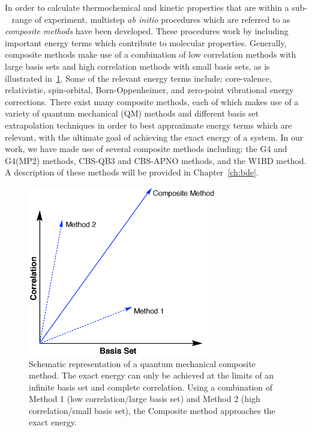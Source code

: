 In order to calculate thermochemical and kinetic properties that are within a sub-\kcalmol~ range of experiment, multistep \emph{ab initio} procedures which are referred to as \emph{composite methods} have been developed.\cite{Karton2016} These procedures work by including important energy terms which contribute to molecular properties. Generally, composite methods make use of a combination of low correlation methods with large basis sets and high correlation methods with small basis sets, as is illustrated in~\ref{fig:comp}. Some of the relevant energy terms include: core-valence, relativistic, spin-orbital, Born-Oppenheimer, and zero-point vibrational energy corrections. There exist many composite methods, each of which makes use of a variety of quantum mechanical (QM) methods and different basis set extrapolation techniques in order to best approximate energy terms which are relevant, with the ultimate goal of achieving the exact energy of a system. In our work, we have made use of several composite methods including: the G4 and G4(MP2) methods,\cite{Curtiss2007,Curtiss2007a} CBS-QB3 and CBS-APNO methods,\cite{Montgomery1999,Montgomery2000,Ochterski1996} and the W1BD method.\cite{Barnes2009} A description of these methods will be provided in Chapter~\ref{ch:bde}.

\begin{figure}[htb]
  \centering
  \includegraphics[height=20em]{figures/compositemethods.eps}
  \caption[Schematic representation of a quantum mechanical composite method.]{Schematic representation of a quantum mechanical composite method. The exact energy can only be achieved at the limits of an infinite basis set and complete correlation. Using a combination of Method 1 (low correlation/large basis set) and Method 2 (high correlation/small basis set), the Composite method approaches the exact energy.}
\label{fig:comp}
\end{figure}

